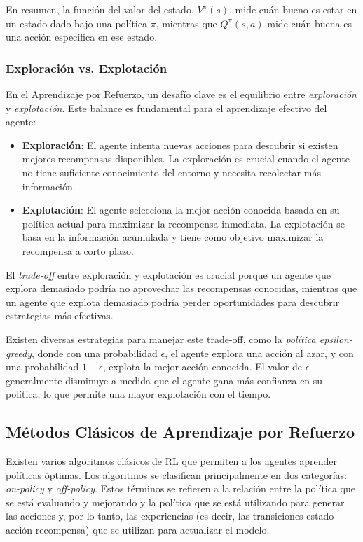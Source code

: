 \documentclass[a4paper,12pt]{report}
\begin{document}
En resumen, la función del valor del estado, \(V^{\pi}(s)\), mide cuán bueno es estar en un estado dado 
bajo una política \(\pi\), mientras que \(Q^{\pi}(s, a)\) mide cuán buena es una acción específica en 
ese estado.


\subsubsection{Exploración vs. Explotación}

En el Aprendizaje por Refuerzo, un desafío clave es el equilibrio entre \textit{exploración} y 
\textit{explotación}. Este balance es fundamental para el aprendizaje efectivo del agente:

\begin{itemize}
    \item \textbf{Exploración}: El agente intenta nuevas acciones para descubrir si existen mejores 
    recompensas disponibles. La exploración es crucial cuando el agente no tiene suficiente conocimiento 
    del entorno y necesita recolectar más información.
    \item \textbf{Explotación}: El agente selecciona la mejor acción conocida basada en su 
    política actual para maximizar la recompensa inmediata. La explotación se basa en la información 
    acumulada y tiene como objetivo maximizar la recompensa a corto plazo.
\end{itemize}

El \textit{trade-off} entre exploración y explotación es crucial porque un agente que explora 
demasiado podría no aprovechar las recompensas conocidas, mientras que un agente que explota 
demasiado podría perder oportunidades para descubrir estrategias más efectivas. 

Existen diversas estrategias para manejar este trade-off, como la \textit{política epsilon-greedy}, 
donde con una probabilidad \(\epsilon\), el agente explora una acción al azar, y con 
una probabilidad \(1-\epsilon\), explota la mejor acción conocida. El valor de \(\epsilon\) 
generalmente disminuye a medida que el agente gana más confianza en su política, lo que permite 
una mayor explotación con el tiempo.

\subsection{Métodos Clásicos de Aprendizaje por Refuerzo}

Existen varios algoritmos clásicos de RL que permiten a los agentes aprender políticas óptimas. Los 
algoritmos se clasifican principalmente en dos categorías: \textit{on-policy} y \textit{off-policy}. 
Estos términos se refieren a la relación entre la política que se está evaluando y mejorando y la 
política que se está utilizando para generar las acciones y, por lo tanto, las experiencias (es decir, 
las transiciones estado-acción-recompensa) que se utilizan para actualizar el modelo.
\end{document}

